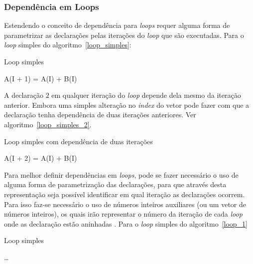 \subsubsection{Dependência em Loops}

Estendendo o conceito de dependência para \textit{loops} requer alguma forma de
parametrizar as declarações pelas iterações do \textit{loop} que são
executadas.
Para o \textit{loop} simples do algoritmo~\ref{loop_simples}:

\begin{algorithm}
        \caption{Loop simples}
        \label{loop_simples}
        \begin{algorithmic}[1]
                \STATE A(I + 1) = A(I) + B(I) 
        \ENDFOR
        \end{algorithmic}
\end{algorithm}

A declaração $2$ em qualquer iteração do \textit{loop} depende dela mesmo da
iteração anterior. Embora uma simples alteração no \textit{index} do vetor pode
fazer com que a declaração tenha dependência de duas iterações anteriores.
Ver algoritmo~\ref{loop_simples_2}.

\begin{algorithm}
        \caption{Loop simples com dependência de duas iterações}
        \label{loop_simples_2}
        \begin{algorithmic}[1]
                \STATE A(I + 2) = A(I) + B(I) 
        \ENDFOR
        \end{algorithmic}
\end{algorithm}

Para melhor definir dependências em \textit{loops},  pode se fazer necessário o
uso de alguma forma de parametrização das declarações, para que através desta
representação seja possível identificar em qual iteração as declarações ocorrem.
Para isso faz-se necessário o uso de números inteiros auxiliares (ou um vetor de
números inteiros), os quais irão representar o número da iteração de cada 
\textit{loop} onde as declaração estão aninhadas \cite{hpcfpc}.
Para o \textit{loop} simples do algoritmo~\ref{loop_1}

\begin{algorithm}
        \caption{Loop simples}
        \label{loop_1}
        \begin{algorithmic}[1]
                \STATE \ldots
                \ENDFOR
        \end{algorithmic}
\end{algorithm}

